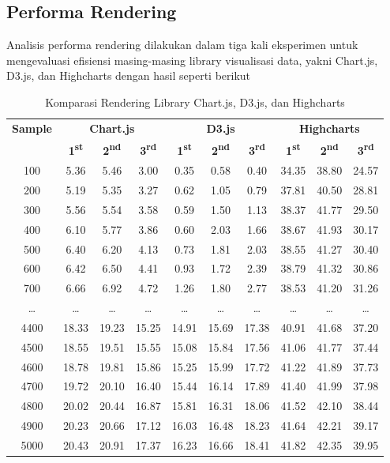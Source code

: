 \subsection{Performa Rendering}
Analisis performa rendering dilakukan dalam tiga kali eksperimen untuk mengevaluasi efisiensi masing-masing library visualisasi data, yakni Chart.js, D3.js, dan Highcharts dengan hasil seperti berikut
\begin{table}[H]
	\centering
	\caption{Komparasi Rendering Library Chart.js, D3.js, dan Highcharts}
	\begin{tabular}{|c|ccc|ccc|ccc|}
		\hline
		\textbf{Sample} & \multicolumn{3}{c|}{\textbf{Chart.js}} & \multicolumn{3}{c|}{\textbf{D3.js}} & \multicolumn{3}{c|}{\textbf{Highcharts}} \\
		& \textbf{1\textsuperscript{st}} & \textbf{2\textsuperscript{nd}} & \textbf{3\textsuperscript{rd}} & \textbf{1\textsuperscript{st}} & \textbf{2\textsuperscript{nd}} & \textbf{3\textsuperscript{rd}} & \textbf{1\textsuperscript{st}} & \textbf{2\textsuperscript{nd}} & \textbf{3\textsuperscript{rd}} \\
		\hline
		100  & 5.36 & 5.46 & 3.00 & 0.35 & 0.58 & 0.40 & 34.35 & 38.80 & 24.57 \\
		200  & 5.19 & 5.35 & 3.27 & 0.62 & 1.05 & 0.79 & 37.81 & 40.50 & 28.81 \\
		300  & 5.56 & 5.54 & 3.58 & 0.59 & 1.50 & 1.13 & 38.37 & 41.77 & 29.50 \\
		400  & 6.10 & 5.77 & 3.86 & 0.60 & 2.03 & 1.66 & 38.67 & 41.93 & 30.17 \\
		500  & 6.40 & 6.20 & 4.13 & 0.73 & 1.81 & 2.03 & 38.55 & 41.27 & 30.40 \\
		600  & 6.42 & 6.50 & 4.41 & 0.93 & 1.72 & 2.39 & 38.79 & 41.32 & 30.86 \\
		700  & 6.66 & 6.92 & 4.72 & 1.26 & 1.80 & 2.77 & 38.53 & 41.20 & 31.26 \\
		\ldots & \ldots & \ldots & \ldots & \ldots & \ldots & \ldots & \ldots & \ldots & \ldots \\
		4400 & 18.33 & 19.23 & 15.25 & 14.91 & 15.69 & 17.38 & 40.91 & 41.68 & 37.20 \\
		4500 & 18.55 & 19.51 & 15.55 & 15.08 & 15.84 & 17.56 & 41.06 & 41.77 & 37.44 \\
		4600 & 18.78 & 19.81 & 15.86 & 15.25 & 15.99 & 17.72 & 41.22 & 41.89 & 37.73 \\
		4700 & 19.72 & 20.10 & 16.40 & 15.44 & 16.14 & 17.89 & 41.40 & 41.99 & 37.98 \\
		4800 & 20.02 & 20.44 & 16.87 & 15.81 & 16.31 & 18.06 & 41.52 & 42.10 & 38.44 \\
		4900 & 20.23 & 20.66 & 17.12 & 16.03 & 16.48 & 18.23 & 41.64 & 42.21 & 39.17 \\
		5000 & 20.43 & 20.91 & 17.37 & 16.23 & 16.66 & 18.41 & 41.82 & 42.35 & 39.95 \\
		\hline
	\end{tabular}
\end{table}

